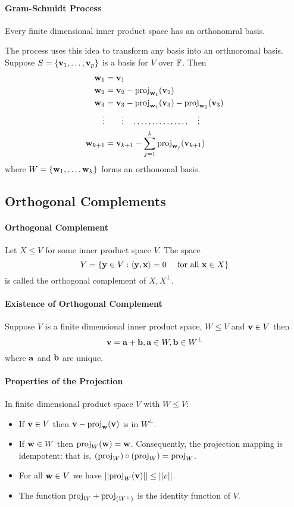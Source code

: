 \paragraph{Gram-Schmidt Process}
Every finite dimensional inner product space has an orthonomral basis.

The process uses this idea to transform any basis into an orthnoromal basis. Suppose \(S = \{\mathbf{v}_1, \dots, \mathbf{v}_p\}\) is a basis for \(V\) over \(\mathbb{F}\). Then
\begin{align*}
    \mathbf{w}_1 & = \mathbf{v}_1 \\
    \mathbf{w}_2 & = \mathbf{v}_2 - \mathrm{proj}_{\mathbf{w}_1}(\mathbf{v}_2) \\
    \mathbf{w}_3 & = \mathbf{v}_3 - \mathrm{proj}_{\mathbf{w}_1}(\mathbf{v}_3) - \mathrm{proj}_{\mathbf{w}_2}(\mathbf{v}_3) \\
    \vdots &  \qquad \vdots \quad \dots\dots\dots\dots\dots \quad \vdots  \\
    \mathbf{w}_{k+1} & = \mathbf{v}_{k+1} - \sum_{j=1}^k \mathrm{proj}_{\mathbf{w}_j}(\mathbf{v}_{k+1})
\end{align*}
where \(W = \{\mathbf{w}_1, \dots, \mathbf{w}_k\}\) forms an orthonomal basis.

\subsection{Orthogonal Complements}
\paragraph{Orthogonal Complement}
Let \(X \leq V\) for some inner product space \(V\). The space
\[Y = \{\mathbf{y} \in V: \langle \mathbf{y}, \mathbf{x} \rangle = 0 \quad \text{ for all } \mathbf{x} \in X\}\]
is called the orthogonal complement of \(X, X^\perp\).

\paragraph{Existence of Orthogonal Complement}
Suppose \(V\) is a finite dimensional inner product space, \(W \leq V\) and \(\mathbf{v} \in V\) then
\[\mathbf{v} = \mathbf{a} + \mathbf{b}, \mathbf{a} \in W, \mathbf{b} \in W^\perp\]
where \(\mathbf{a}\) and \(\mathbf{b}\) are unique.

\paragraph{Properties of the Projection}
In finite dimensional product space \(V\) with \(W \leq V\):
\begin{itemize}
    \item If \(\mathbf{v} \in V\) then \(\mathbf{v} - \mathrm{proj}_{\mathbf{w}}(\mathbf{v})\) is in \(W^\perp\).
    \item If \(\mathbf{w} \in W\) then \(\mathrm{proj}_W(\mathbf{w}) = \mathbf{w}\). Consequently, the projection mapping is idempotent: that is, \((\mathrm{proj}_W) \circ (\mathrm{proj}_W) = \mathrm{proj}_W\).
    \item For all \(\mathbf{w} \in V\) we have \(||\mathrm{proj}_W(\mathbf{v}) || \leq ||v||\).
    \item The function \(\mathrm{proj}_W + \mathrm{proj}_{(W^\perp)}\) is the identity function of \(V\).
\end{itemize}

